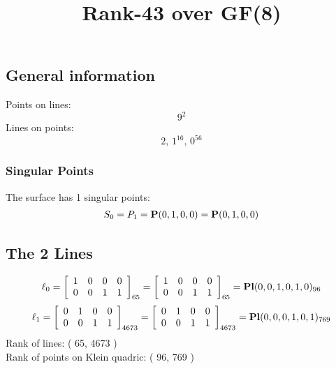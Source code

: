 \documentclass{article}
\newcommand\setTBstruts{\def\T{\rule{0pt}{2.6ex}}%
\def\B{\rule[-1.2ex]{0pt}{0pt}}}
\newcommand{\bP}{{\bf P}}
\begin{document}
 
\setTBstruts



{\allowdisplaybreaks%






\title{Rank-43 over GF(8)}
\author{}%
\maketitle%
%
{}



\subsection*{General information}
Points on lines:
$$
9^2$$
Lines on points:
$$
2,\,1^{16},\,0^{56}$$
\subsubsection*{Singular Points}
The surface has 1 singular points:\\
\begin{align*}
S_{0} &= P_{1}=\bP(0, 1, 0, 0) = \bP(0, 1, 0, 0)\\
\end{align*}
\subsection*{The 2 Lines}
$$
\ell_{0} = 
\left[
\begin{array}{*{4}{r}}
1 & 0 & 0 & 0\\
0 & 0 & 1 & 1\\
\end{array}
\right]
_{65}
=
\left[
\begin{array}{*{4}c}
1  & 0  & 0  & 0\\
0  & 0  & 1  & 1\\
\end{array}
\right]_{65}
={\rm\bf Pl}(0,0,1,0,1,0 )_{96}$$
$$
\ell_{1} = 
\left[
\begin{array}{*{4}{r}}
0 & 1 & 0 & 0\\
0 & 0 & 1 & 1\\
\end{array}
\right]
_{4673}
=
\left[
\begin{array}{*{4}c}
0  & 1  & 0  & 0\\
0  & 0  & 1  & 1\\
\end{array}
\right]_{4673}
={\rm\bf Pl}(0,0,0,1,0,1 )_{769}$$
Rank of lines: ( 65, 4673 )\\
Rank of points on Klein quadric: ( 96, 769 )\\
}
\end{document}

